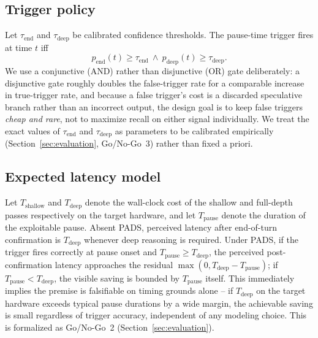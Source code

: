 \documentclass[journal]{IEEEtran}
\begin{document}
\subsection{Trigger policy}
\label{sec:trigger}
Let $\tau_{\text{end}}$ and $\tau_{\text{deep}}$ be calibrated confidence thresholds. The pause-time trigger fires at time $t$ iff
\begin{equation}
p_{\text{end}}(t) \geq \tau_{\text{end}} \ \wedge\ p_{\text{deep}}(t) \geq \tau_{\text{deep}}.
\label{eq:trigger}
\end{equation}
We use a conjunctive (AND) rather than disjunctive (OR) gate deliberately: a disjunctive gate roughly doubles the false-trigger rate for a comparable increase in true-trigger rate, and because a false trigger's cost is a discarded speculative branch rather than an incorrect output, the design goal is to keep false triggers \emph{cheap and rare}, not to maximize recall on either signal individually. We treat the exact values of $\tau_{\text{end}}$ and $\tau_{\text{deep}}$ as parameters to be calibrated empirically (Section~\ref{sec:evaluation}, Go/No-Go~3) rather than fixed a priori.

\subsection{Expected latency model}
Let $T_{\text{shallow}}$ and $T_{\text{deep}}$ denote the wall-clock cost of the shallow and full-depth passes respectively on the target hardware, and let $T_{\text{pause}}$ denote the duration of the exploitable pause. Absent PADS, perceived latency after end-of-turn confirmation is $T_{\text{deep}}$ whenever deep reasoning is required. Under PADS, if the trigger fires correctly at pause onset and $T_{\text{pause}} \geq T_{\text{deep}}$, the perceived post-confirmation latency approaches the residual $\max(0, T_{\text{deep}} - T_{\text{pause}})$; if $T_{\text{pause}} < T_{\text{deep}}$, the visible saving is bounded by $T_{\text{pause}}$ itself. This immediately implies the premise is falsifiable on timing grounds alone -- if $T_{\text{deep}}$ on the target hardware exceeds typical pause durations by a wide margin, the achievable saving is small regardless of trigger accuracy, independent of any modeling choice. This is formalized as Go/No-Go~2 (Section~\ref{sec:evaluation}).
\end{document}
